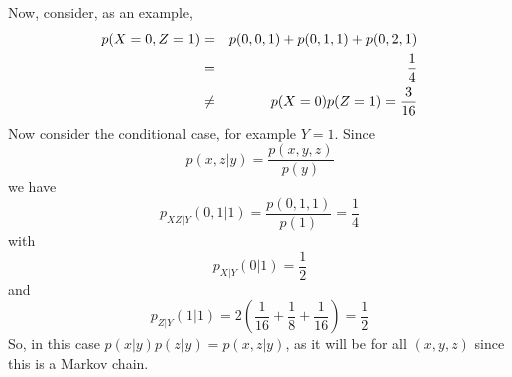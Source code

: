 \documentclass[12pt]{article}
\begin{document}
Now, consider, as an example, 
\begin{eqnarray}
p(X=0,Z=1)&=&p(0,0,1)+p(0,1,1)+p(0,2,1)\cr
&=&\frac{1}{4}\cr
&\not=&p(X=0)p(Z=1)=\frac{3}{16}
\end{eqnarray}
Now consider the conditional case, for example $Y=1$. Since 
\begin{equation}
p(x,z|y)=\frac{p(x,y,z)}{p(y)}
\end{equation}
we have
\begin{equation}
p_{XZ|Y}(0,1|1)=\frac{p(0,1,1)}{p(1)}=\frac{1}{4}
\end{equation}
with
\begin{equation}
p_{X|Y}(0|1)=\frac{1}{2}
\end{equation}
and
\begin{equation}
p_{Z|Y}(1|1)=2\left(\frac{1}{16}+\frac{1}{8}+\frac{1}{16}\right)=\frac{1}{2}
\end{equation}
So, in this case $p(x|y)p(z|y)=p(x,z|y)$, as it will be for all $(x,y,z)$ since this is a Markov chain.
\end{document}
